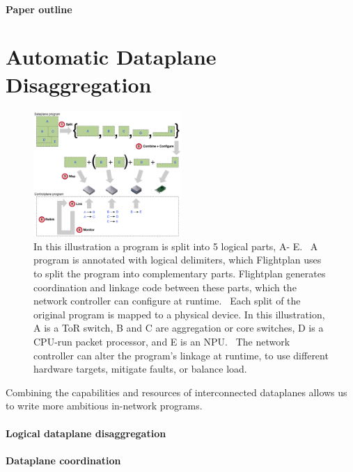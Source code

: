 \documentclass[letterpaper,twocolumn,10pt]{article}
\begin{document}
\paragraph{Paper outline}
\TODO{}


\section{Automatic Dataplane Disaggregation}
\begin{figure}[t]
\centering
\includegraphics[width=0.5\textwidth]{workflow.pdf}
\caption{\label{fig:workflow}
\TODO{}  
In this illustration a program is split into 5 logical parts, {\sf\color{blue} A}-{\sf\color{blue} E}.
{\color{red}}~A program is annotated with logical delimiters, which Flightplan uses to split the program into complementary parts. Flightplan generates coordination and linkage code between these parts, which the network controller can configure at runtime.
{\color{red}}~Each split of the original program is mapped to a physical device. In this illustration,
 {\sf\color{blue} A} is a ToR switch,
 {\sf\color{blue} B} and {\sf\color{blue} C} are aggregation or core switches,
 {\sf\color{blue} D} is a CPU-run packet processor, and
 {\sf\color{blue} E} is an NPU.
{\color{red}}~The network controller can alter the program's linkage at runtime, to use different hardware targets, mitigate faults, or balance load.
}
\end{figure}

Combining the capabilities and resources of interconnected dataplanes
allows us to write more ambitious in-network programs.

\paragraph{Logical dataplane disaggregation}
\paragraph{Dataplane coordination}
\end{document}
